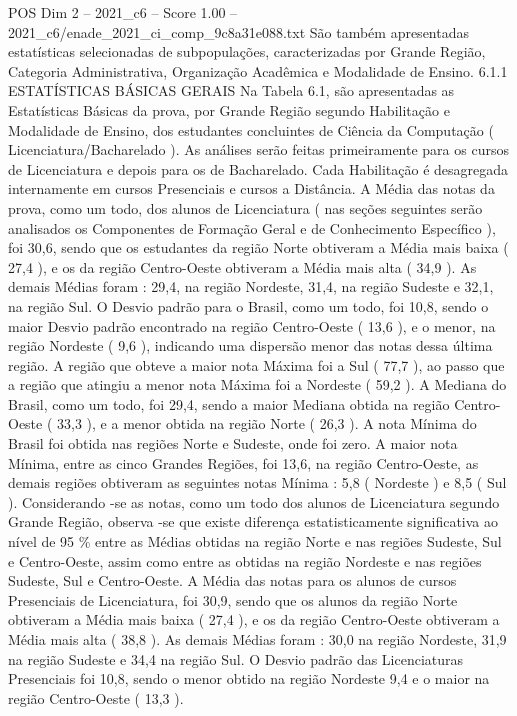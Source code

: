 \begin{textsample}{POS Dim 2 – 2021\_c6 – Score 1.00 – 2021\_c6/enade\_2021\_ci\_comp\_9c8a31e088.txt}
São também apresentadas estatísticas selecionadas de subpopulações, caracterizadas por Grande Região, Categoria Administrativa, Organização Acadêmica e Modalidade de Ensino. 6.1.1 ESTATÍSTICAS BÁSICAS GERAIS Na Tabela 6.1, são apresentadas as Estatísticas Básicas da prova, por Grande Região segundo Habilitação e Modalidade de Ensino, dos estudantes concluintes de Ciência da Computação ( Licenciatura/Bacharelado ).
As análises serão feitas primeiramente para os cursos de Licenciatura e depois para os de Bacharelado.
Cada Habilitação é desagregada internamente em cursos Presenciais e cursos a Distância.
A Média das notas da prova, como um todo, dos alunos de Licenciatura ( nas seções seguintes serão analisados os Componentes de Formação Geral e de Conhecimento Específico ), foi 30,6, sendo que os estudantes da região Norte obtiveram a Média mais baixa ( 27,4 ), e os da região Centro-Oeste obtiveram a Média mais alta ( 34,9 ).
As demais Médias foram : 29,4, na região Nordeste, 31,4, na região Sudeste e 32,1, na região Sul.
O Desvio padrão para o Brasil, como um todo, foi 10,8, sendo o maior Desvio padrão encontrado na região Centro-Oeste ( 13,6 ), e o menor, na região Nordeste ( 9,6 ), indicando uma dispersão menor das notas dessa última região.
A região que obteve a maior nota Máxima foi a Sul ( 77,7 ), ao passo que a região que atingiu a menor nota Máxima foi a Nordeste ( 59,2 ).
A Mediana do Brasil, como um todo, foi 29,4, sendo a maior Mediana obtida na região Centro-Oeste ( 33,3 ), e a menor obtida na região Norte ( 26,3 ).
A nota Mínima do Brasil foi obtida nas regiões Norte e Sudeste, onde foi zero.
A maior nota Mínima, entre as cinco Grandes Regiões, foi 13,6, na região Centro-Oeste, as demais regiões obtiveram as seguintes notas Mínima : 5,8 ( Nordeste ) e 8,5 ( Sul ).
Considerando -se as notas, como um todo dos alunos de Licenciatura segundo Grande Região, observa -se que existe diferença estatisticamente significativa ao nível de 95 \% entre as Médias obtidas na região Norte e nas regiões Sudeste, Sul e Centro-Oeste, assim como entre as obtidas na região Nordeste e nas regiões Sudeste, Sul e Centro-Oeste.
A Média das notas para os alunos de cursos Presenciais de Licenciatura, foi 30,9, sendo que os alunos da região Norte obtiveram a Média mais baixa ( 27,4 ), e os da região Centro-Oeste obtiveram a Média mais alta ( 38,8 ).
As demais Médias foram : 30,0 na região Nordeste, 31,9 na região Sudeste e 34,4 na região Sul.
O Desvio padrão das Licenciaturas Presenciais foi 10,8, sendo o menor obtido na região Nordeste 9,4 e o maior na região Centro-Oeste ( 13,3 ).

\end{textsample}
